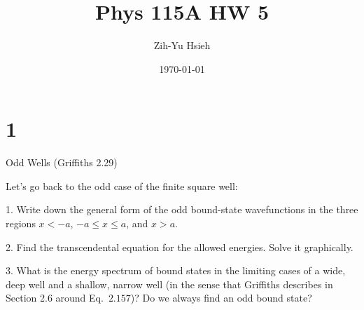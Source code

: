 \documentclass{article}
\title{Phys 115A HW 5}
\author{Zih-Yu Hsieh}
\date{\today}
\begin{document}
\maketitle

\section*{1}
\begin{ques}
Odd Wells (Griffiths 2.29)

Let’s go back to the odd case of the finite square well:

1. Write down the general form of the odd bound-state wavefunctions in the three regions $x < -a$, $-a \le x \le a$, and $x > a$.

2. Find the transcendental equation for the allowed energies. Solve it graphically.

3. What is the energy spectrum of bound states in the limiting cases of a wide, deep well and a shallow, narrow well (in the sense that Griffiths describes in Section 2.6 around Eq.\ $2.157$)? Do we always find an odd bound state?
\end{ques}
\end{document}
